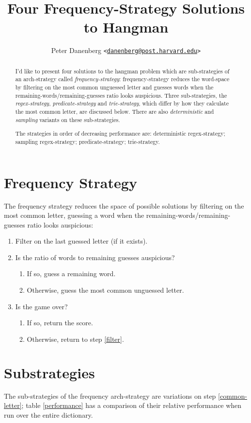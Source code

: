 \documentclass{article}
\title{Four Frequency-Strategy Solutions to Hangman}
\author{Peter Danenberg
  \texttt{<}\href{mailto:danenberg@post.harvard.edu}
  {\nolinkurl{danenberg@post.harvard.edu}}\texttt{>}}
\begin{document}
\maketitle
\begin{abstract}
I'd like to present four solutions to the hangman problem which are
sub-strategies of an arch-strategy called \emph{frequency-strategy}:
frequency-strategy reduces the word-space by filtering on the most
common unguessed letter and guesses words when the
remaining-words/remaining-guesses ratio looks auspicious. Three
sub-strategies, the \emph{regex-strategy}, \emph{predicate-strategy}
and \emph{trie-strategy}, which differ by how they calculate the most
common letter, are discussed below. There are also
\emph{deterministic} and \emph{sampling} variants on these
sub-strategies.

The strategies in order of decreasing performance are: deterministic
regex-strategy; sampling regex-strategy; predicate-strategy;
trie-strategy.
\end{abstract}
\tableofcontents
\section{Frequency Strategy}
The frequency strategy reduces the space of possible solutions by
filtering on the most common letter, guessing a word when the
remaining-words/remaining-guesses ratio looks auspicious:

\begin{enumerate}
\item \label{filter} Filter on the last guessed letter (if it exists).
\item Is the ratio of words to remaining guesses auspicious?
  \begin{enumerate}
  \item If so, guess a remaining word.
  \item \label{common-letter} Otherwise, guess the most common unguessed letter.
  \end{enumerate}
\item Is the game over?
  \begin{enumerate}
  \item If so, return the score.
  \item Otherwise, return to step \ref{filter}.
  \end{enumerate}
\end{enumerate}

\section{Substrategies}
The sub-strategies of the frequency arch-strategy are variations on
step \ref{common-letter}; table \ref{performance} has a comparison of
their relative performance when run over the entire dictionary.
\end{document}
